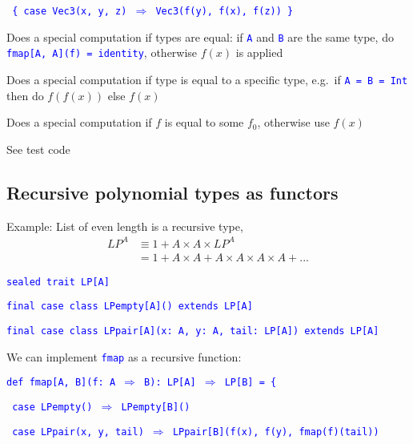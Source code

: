 \texttt{\textcolor{blue}{\footnotesize{}  \{ case Vec3(x, y, z) $\Rightarrow$
Vec3(f(y), f(x), f(z)) \}}}{\footnotesize\par}

Does a special computation if types are equal: if \texttt{\textcolor{blue}{\footnotesize{}A}}
and \texttt{\textcolor{blue}{\footnotesize{}B}} are the same type,
do \texttt{\textcolor{blue}{\footnotesize{}fmap{[}A, A{]}(f) = identity}},
otherwise $f(x)$ is applied

Does a special computation if type is equal to a specific type, e.g.\ if
\texttt{\textcolor{blue}{\footnotesize{}A = B = Int}} then do $f(f(x))$
else $f(x)$

Does a special computation if $f$ is equal to some $f_{0}$, otherwise
use $f(x)$

See test code


\subsection{Recursive polynomial types as functors}

Example: List of even length is a recursive type,
\begin{align*}
LP^{A} & \equiv1+A\times A\times LP^{A}\\
 & =1+A\times A+A\times A\times A\times A+...
\end{align*}

\texttt{\textcolor{blue}{\footnotesize{}sealed trait LP{[}A{]}}}{\footnotesize\par}

\texttt{\textcolor{blue}{\footnotesize{}final case class LPempty{[}A{]}()
extends LP{[}A{]}}}{\footnotesize\par}

\texttt{\textcolor{blue}{\footnotesize{}final case class LPpair{[}A{]}(x: A,
y: A, tail: LP{[}A{]}) extends LP{[}A{]}}}{\footnotesize\par}

We can implement \texttt{\textcolor{blue}{\footnotesize{}fmap}} as
a recursive function:

\texttt{\textcolor{blue}{\footnotesize{}def fmap{[}A, B{]}(f: A $\Rightarrow$
B): LP{[}A{]} $\Rightarrow$ LP{[}B{]} = \{}}{\footnotesize\par}

\texttt{\textcolor{blue}{\footnotesize{}  case LPempty() $\Rightarrow$
LPempty{[}B{]}()}}{\footnotesize\par}

\texttt{\textcolor{blue}{\footnotesize{}  case LPpair(x, y, tail)
$\Rightarrow$ LPpair{[}B{]}(f(x), f(y), fmap(f)(tail))}}{\footnotesize\par}


